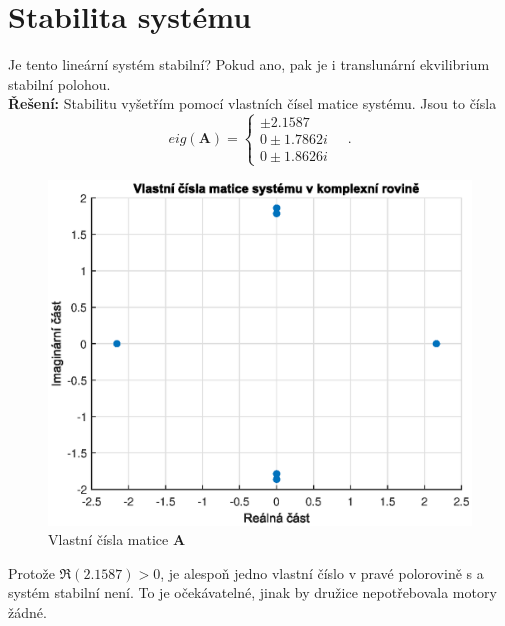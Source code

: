 \documentclass[twoside]{article}
\begin{document}
\section{Stabilita systému}
\label{sec:ukol1}
Je tento lineární systém stabilní? Pokud ano, pak je i translunární ekvilibrium stabilní polohou. \\
\textbf{Řešení:}
Stabilitu vyšetřím pomocí vlastních čísel matice systému. Jsou to čísla
\begin{equation*}
	eig(\mathbf{A}) =
	\begin{cases}
		\pm 2.1587 & \\
		0 \pm 1.7862i & \\
		0 \pm 1.8626i \ &
	\end{cases}.
\end{equation*}
\begin{figure}
	\includegraphics{vlastni_cisla.eps}
	\caption{Vlastní čísla matice $\mathbf{A}$}
	\label{fig:vlastni_cisla}
\end{figure}
Protože $\Re(2.1587) > 0$, je alespoň jedno vlastní číslo v pravé polorovině s a systém stabilní není.
To je očekávatelné, jinak by družice nepotřebovala motory žádné. 
\end{document}
